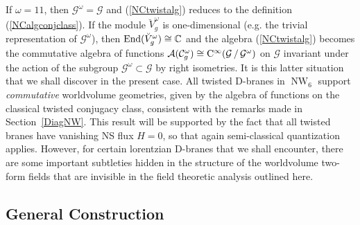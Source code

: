 \documentclass[11pt,a4paper]{article}
\DeclareMathOperator{\NW}{NW}
\newcommand{\complex}{{\mathbb C}} %
\newcommand{\id}{{1\!\!1}} %
\begin{document}
If $\omega=\id$, then
$\mathcal{G}^\omega=\mathcal{G}$ and (\ref{NCtwistalg}) reduces to the
definition (\ref{NCalgconjclass}). If the module $\breve{V}_g^\omega$ is
one-dimensional (e.g. the trivial representation of
$\mathcal{G}^\omega$), then ${\rm
  End}(\breve{V}_g^\omega)\cong\complex$ and
the algebra (\ref{NCtwistalg}) becomes the commutative algebra of
functions $\mathcal{A}(\mathcal{C}_g^\omega)\cong{\rm
  C}^\infty(\mathcal{G}\,/\,\mathcal{G}^\omega)$ on $\mathcal{G}$
invariant under the action of the subgroup
$\mathcal{G}^\omega\subset\mathcal{G}$ by right isometries. It is this latter
situation that we shall discover in the present case. All twisted
D-branes in $\NW_6$ support {\it commutative} worldvolume geometries,
given by the algebra of functions on the classical twisted conjugacy
class, consistent with the remarks made in
Section~\ref{DiagNW}. This result will be supported by the fact that all
twisted branes have vanishing NS flux $H=0$, so that again semi-classical
quantization applies. However, for certain lorentzian D-branes that we shall
encounter, there are some important subtleties hidden in the structure of the
worldvolume two-form fields that are invisible in the field theoretic analysis
outlined here.

\subsection{General Construction\label{GenConstrTwist}}
\end{document}
